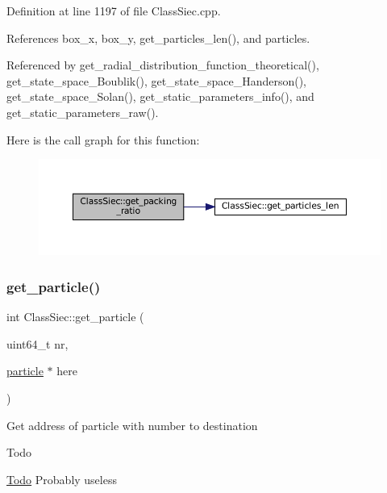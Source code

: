 Definition at line 1197 of file Class\+Siec.\+cpp.



References box\+\_\+x, box\+\_\+y, get\+\_\+particles\+\_\+len(), and particles.



Referenced by get\+\_\+radial\+\_\+distribution\+\_\+function\+\_\+theoretical(), get\+\_\+state\+\_\+space\+\_\+\+Boublik(), get\+\_\+state\+\_\+space\+\_\+\+Handerson(), get\+\_\+state\+\_\+space\+\_\+\+Solan(), get\+\_\+static\+\_\+parameters\+\_\+info(), and get\+\_\+static\+\_\+parameters\+\_\+raw().

Here is the call graph for this function\+:
\nopagebreak
\begin{figure}[H]
\begin{center}
\leavevmode
\includegraphics[width=350pt]{classClassSiec_a1b7f3db9473b2660b3a6c1dfeee45e22_cgraph}
\end{center}
\end{figure}
\mbox{\label{classClassSiec_aa4c36868471f5747008cea881f1038c1}} 
\subsubsection{\texorpdfstring{get\+\_\+particle()}{get\_particle()}}
{\footnotesize\ttfamily int Class\+Siec\+::get\+\_\+particle (\begin{DoxyParamCaption}\item[{uint64\+\_\+t}]{nr,  }\item[{\mbox{\hyperlink{structparticle}{particle}} $\ast$}]{here }\end{DoxyParamCaption})}

Get address of particle with number to destination \begin{DoxyRefDesc}{Todo}
\item[\mbox{\hyperlink{todo__todo000004}{Todo}}]Probably useless \end{DoxyRefDesc}

